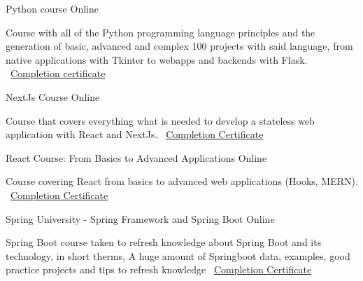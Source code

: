 \documentclass[]{awesome-cv}
\begin{document}
\begin{cventries}
    \cventry
	{}
	{Python course \vspace{-4mm}}
	{Online \vspace{-5mm}}
	{}
	{\begin{sectionnormaltext} 
		\item{Course with all of the Python programming language principles and the generation of basic, advanced and complex 100 projects with said language, from native applications with Tkinter to webapps and backends with Flask.
		\newline \vspace{2mm} \faLink\ \href{https://www.udemy.com/certificate/UC-2d01021e-af92-434c-a4a3-7fc7b33976c9/}{Completion  certificate}}
	\end{sectionnormaltext}}
    {}
 
	\cventry
	{}
	{NextJs Course \vspace{-4mm}}
	{Online \vspace{-5mm}}
	{}
	{\begin{sectionnormaltext} 
		\item{Course that covers everything what is needed to develop a stateless web application with React and NextJs. 
		\newline \vspace{2mm} \faLink\ \href{https://www.udemy.com/certificate/UC-1ede8757-aa0d-406f-813a-8eaa400532c5/}{Completion Certificate}}
	\end{sectionnormaltext}}
    {}

	\cventry
	{}
	{React Course: From Basics to Advanced Applications \vspace{-4mm}}
	{Online \vspace{-5mm}}
	{}
	{\begin{sectionnormaltext} 
		\item{Course covering React from basics to advanced web applications (Hooks, MERN).
		\newline \vspace{2mm} \faLink\ \href{https://www.udemy.com/certificate/UC-fcb467ab-c089-419c-9b6a-afe97f894d14/}{Completion Certificate}}
	\end{sectionnormaltext}}
    {}

	\cventry
	{}
	{Spring University - Spring Framework and Spring Boot \vspace{-4mm}}
	{Online \vspace{-5mm}}
	{}
	{\begin{sectionnormaltext} 
		\item{Spring Boot course taken to refresh knowledge about Spring Boot and its technology, in short therms, A huge amount of Springboot data, examples, good practice projects and tips to refresh knowledge
		\newline \vspace{2mm} \faLink\ \href{https://www.udemy.com/certificate/UC-ee0ce349-6915-479b-b038-5253aba9d0d8/}{Completion Certificate}}
	\end{sectionnormaltext}}
    {}


\end{cventries}
\end{document}
